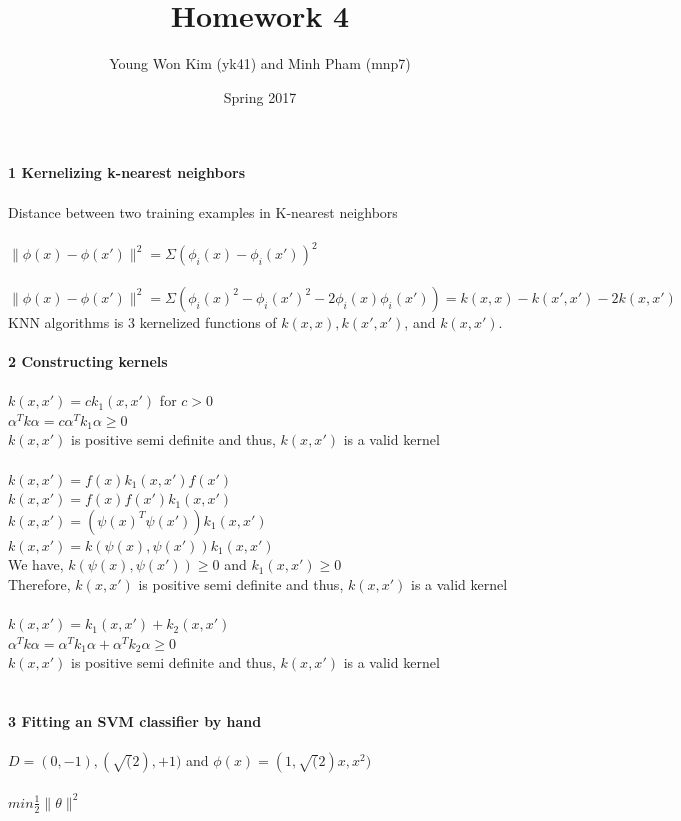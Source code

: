 \documentclass[12pt]{article}
\title{Homework 4}
\author{Young Won Kim (yk41) and Minh Pham (mnp7)}
\date{Spring 2017}
\begin{document}
\maketitle
\noindent \textbf{1 Kernelizing k-nearest neighbors} \\
\\ 
Distance between two training examples in K-nearest neighbors 
\\
\\
$\|\phi (x) - \phi (x') \| ^2 = \Sigma (\phi_i (x) - \phi_i (x'))^2$
\\
\\
$\|\phi (x) - \phi (x') \| ^2  = \Sigma (\phi_i(x)^2 - \phi_i(x')^2 - 2\phi_i(x)\phi_i(x')) = k(x,x) - k(x',x') - 2k(x,x')$ \\

KNN algorithms is 3 kernelized functions of $k(x,x), k(x',x')$, and $k(x,x')$.\\
\\
\noindent \textbf{2 Constructing kernels} \\
\\
$k(x,x') = c k_1(x,x')$ for $c > 0$\\
$\alpha^T k \alpha = c \alpha^T k_1 \alpha \geq 0$\\
$k(x,x')$ is positive semi definite and thus, $k(x,x')$ is a valid kernel
\\
\\
$k(x,x') = f(x)k_1(x,x')f(x')$\\
$k(x,x') = f(x)f(x')k_1(x,x')$\\
$k(x,x') = (\psi(x)^T \psi(x')) k_1(x,x')$\\
$k(x,x') = k(\psi(x), \psi(x'))k_1(x,x')$\\
We have, $k(\psi(x), \psi(x')) \geq 0$ and  $k_1(x,x') \geq 0$\\
Therefore, $k(x,x')$ is positive semi definite and thus, $k(x,x')$ is a valid kernel
\\
\\
$k(x,x') = k_1(x,x') + k_2(x,x')$\\
$\alpha^Tk\alpha = \alpha^Tk_1\alpha + \alpha^Tk_2\alpha \geq 0$\\
$k(x,x')$ is positive semi definite and thus, $k(x,x')$ is a valid kernel\\
\\
\\
\noindent \textbf{3 Fitting an SVM classifier by hand} \\
\\$D = {(0,-1),(\sqrt(2),+1)}$ and $\phi(x) = (1, \sqrt(2)x, x^2)$
\\
\\
$min \frac{1}{2} \|\theta\|^2$ \\
\end{document}
